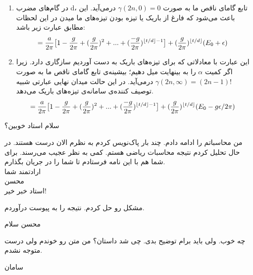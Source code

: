\begin{enumerate}
	\item 
	در گام‌های مضرب d، تابع گامای ناقص ما به صورت 
	$ \gamma(2n,0) = 0 $
	درمی‌آید. این باعث می‌شود که فارغ از باریک یا تیزه بودن تیزه‌های ما میدن در این لحظات مطابق 		عبارت زیر باشد:
	\begin{align}
		&= \frac{a}{2\pi} \big[ 1 - \frac{g}{2\pi} + (\frac{g}{2\pi})^2 + ... + (\frac{-g}{2\pi})^{\left\lfloor t/d \right\rfloor - 1} \big] + (\frac{g}{2\pi})^{\left\lfloor t/d \right\rfloor} (E_0 + \epsilon)
	\end{align}
	
	\item 
	این عبارت با معادلاتی که برای تیزه‌های باریک به دست آوردیم سازگاری دارد. زیرا اگر کمیت
	$\alpha$
	را به بینهایت میل دهیم؛ بیشینه‌ی تابع گامای ناقص ما به صورت 
	$ \gamma(2n,\infty) = (2n-1)! $
	درمی‌آید. در این حالت میدان نهایی عبارتی شبیه توصیف ‌کننده‌ی سامانه‌ی تیزه‌های باریک می‌دهد.
	\begin{align}
		&= \frac{a}{2\pi} \big[ 1 - \frac{g}{2\pi} + (\frac{g}{2\pi})^2 + ... + (\frac{-g}{2\pi})^{\left\lfloor t/d \right\rfloor - 1} \big] + (\frac{g}{2\pi})^{\left\lfloor t/d \right\rfloor} (E_0 - g\epsilon/2\pi)
	\end{align}
	
\end{enumerate}

\begin{mohsenletter}
	سلام استاد خوبین؟
	
	من محاسباتم را ادامه دادم. چند بار پاک‌نویس کردم به نظرم الان درست هستند. در حال تحلیل کردم نتیجه محاسبات ریاضی هستم. کمی به نظر عجیب می‌رسند. برای شما هم با این نامه فرستادم تا شما را در جریان بگذارم.\\
	
	ارادتمند شما\\
	محسن\\
	\medskip
	استاد خبر خیر!
	
	مشکل رو حل کردم. نتیجه را به پیوست درآوردم.
	
	محسن
	سلام
	
	چه خوب. ولی باید برام توضیح بدی. چی شد داستان؟ من متن رو خوندم ولی درست متوجه نشدم.
	
	سامان

\end{mohsenletter}

